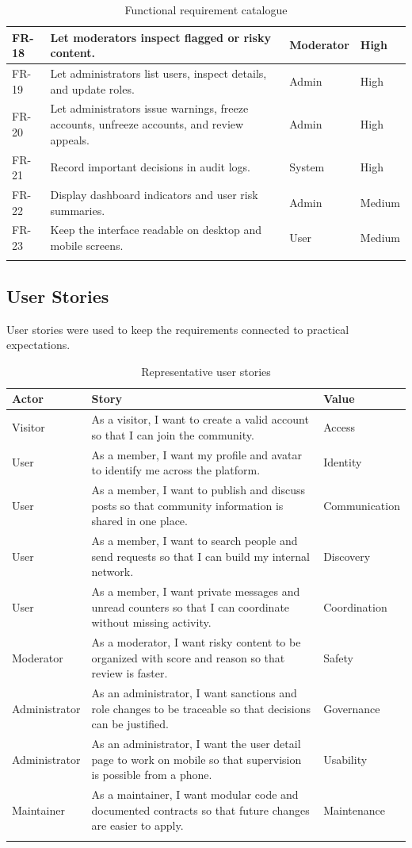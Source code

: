 \begin{longtable}{|m{1.8cm}|m{8.6cm}|m{2.4cm}|m{1.8cm}|}
\hline
FR-18 & Let moderators inspect flagged or risky content. & Moderator & High \\
\hline
FR-19 & Let administrators list users, inspect details, and update roles. & Admin & High \\
\hline
FR-20 & Let administrators issue warnings, freeze accounts, unfreeze accounts, and review appeals. & Admin & High \\
\hline
FR-21 & Record important decisions in audit logs. & System & High \\
\hline
FR-22 & Display dashboard indicators and user risk summaries. & Admin & Medium \\
\hline
FR-23 & Keep the interface readable on desktop and mobile screens. & User & Medium \\
\hline
\caption{Functional requirement catalogue}
\end{longtable}

\subsection*{User Stories}

User stories were used to keep the requirements connected to practical expectations.

\begin{longtable}{|m{2.8cm}|m{8.2cm}|m{3cm}|}
\hline
\textbf{Actor} & \textbf{Story} & \textbf{Value} \\
\hline
Visitor & As a visitor, I want to create a valid account so that I can join the community. & Access \\
\hline
User & As a member, I want my profile and avatar to identify me across the platform. & Identity \\
\hline
User & As a member, I want to publish and discuss posts so that community information is shared in one place. & Communication \\
\hline
User & As a member, I want to search people and send requests so that I can build my internal network. & Discovery \\
\hline
User & As a member, I want private messages and unread counters so that I can coordinate without missing activity. & Coordination \\
\hline
Moderator & As a moderator, I want risky content to be organized with score and reason so that review is faster. & Safety \\
\hline
Administrator & As an administrator, I want sanctions and role changes to be traceable so that decisions can be justified. & Governance \\
\hline
Administrator & As an administrator, I want the user detail page to work on mobile so that supervision is possible from a phone. & Usability \\
\hline
Maintainer & As a maintainer, I want modular code and documented contracts so that future changes are easier to apply. & Maintenance \\
\hline
\caption{Representative user stories}
\end{longtable}

